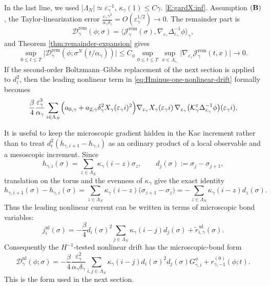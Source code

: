 \documentclass{article}
\begin{document}
In the last line, we used \(|\Lambda_N|\simeq\varepsilon_\gamma^{-1}\),
\(\kappa_\gamma(1)\le C\gamma\).
\eqref{E:gardX:inf}.  
Assumption \(({\bf B})\), the Taylor-linearization error 
\(
\frac{\varepsilon_\gamma\gamma^3}{\alpha_\gamma\delta_\gamma} = O(\varepsilon_\gamma^{1/2})\rightarrow0 .
\)
The remainder part is 
\begin{equation}\label{eq:Hminus-one-remainder-drift} \mathcal D_\gamma^{\mathrm{rem}}(\phi;\sigma)
=
\bigl\langle
\mathcal J_\gamma^{\mathrm{rem}}(\sigma),
\nabla_{\varepsilon_\gamma}\Delta_{\varepsilon_\gamma}^{-1}\phi
\bigr\rangle_\gamma,
\end{equation}
and Theorem \ref{thm:remainder-expansion} gives
\[
\sup_{0\le t\le T}
\bigl|
\mathcal D_\gamma^{\mathrm{rem}}(\phi;\sigma^N(t/\alpha_\gamma))
\bigr|
\le
C_\phi
\sup_{0\le t\le T}\sup_{x\in\Lambda_{\varepsilon_\gamma}}
\bigl|
\nabla_{\varepsilon_\gamma}\mathcal J_\gamma^{\mathrm{rem}}(t,x)
\bigr|
\longrightarrow0 .
\]
If the second-order Boltzmann--Gibbs replacement of the next section is applied to \(d_i^2\), then the leading nonlinear term in \eqref{eq:Hminus-one-nonlinear-drift} formally becomes
\[
\frac{\beta}{4}\frac{\varepsilon_\gamma^3}{\alpha_\gamma}
\sum_{i\in\Lambda_N}
\Bigl(a_{0,\gamma}+a_{2,\gamma}\delta_\gamma^2X_\gamma(\varepsilon_\gamma i)^2\Bigr)
\nabla_{\varepsilon_\gamma}X_\gamma(\varepsilon_\gamma i)\,
\nabla_{\varepsilon_\gamma}
\bigl(\mathcal K_\gamma^\varepsilon\Delta_{\varepsilon_\gamma}^{-1}\phi\bigr)(\varepsilon_\gamma i),
\]

It is useful to keep the microscopic gradient hidden in the Kac increment rather
than to treat \(d_i^2(h_{\gamma,i+1}-h_{\gamma,i})\) as an ordinary product of a
local observable and a mesoscopic increment.  Since
\[
h_{\gamma,i}(\sigma)=\sum_{z\in\Lambda_N}\kappa_\gamma(i-z)\sigma_z,
\qquad
d_j(\sigma):=\sigma_j-\sigma_{j+1},
\]
translation on the torus and the evenness of \(\kappa_\gamma\) give the exact identity
\begin{equation}\label{eq:kac-increment-as-bond-average}
    h_{\gamma,i+1}(\sigma)-h_{\gamma,i}(\sigma) = \sum_{z\in\Lambda_N}\kappa_\gamma(i-z)
\bigl(\sigma_{z+1}-\sigma_z\bigr) = -\sum_{z\in\Lambda_N}\kappa_\gamma(i-z)d_z(\sigma).
\end{equation}
Thus the leading nonlinear current can be written in terms of
microscopic bond variables:
\[
j_i^{\mathrm{nl}}(\sigma)
=
-\frac{\beta}{4}d_i(\sigma)^2
\sum_{j\in\Lambda_N}\kappa_\gamma(i-j)d_j(\sigma)
+\widetilde r_{i,\gamma}^{\,\mathrm{nl}}(\sigma).
\]
Consequently the \(H^{-1}\)-tested nonlinear drift has the microscopic-bond
form
\begin{equation}\label{eq:clean-microscopic-bond-drift}
\mathcal D_\gamma^{\mathrm{nl}}(\phi;\sigma)
=
-\frac{\beta}{4}
\frac{\varepsilon_\gamma^2}{\alpha_\gamma\delta_\gamma}
\sum_{i,j\in\Lambda_N}
\kappa_\gamma(i-j)d_i(\sigma)^2d_j(\sigma)G_{\gamma,i}^{\phi}
+r_{\gamma,-1}^{(0)}(\phi;t).
\end{equation}
This is the form used in the next section.  
\end{document}
